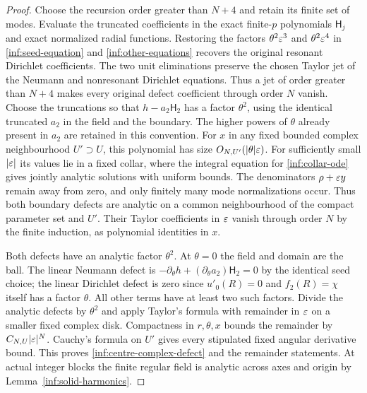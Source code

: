 \begin{proof}
Choose the recursion order greater than $N+4$ and retain its finite
set of modes. Evaluate the truncated coefficients in the exact
finite-$p$ polynomials $\mathsf H_j$ and exact normalized radial functions.
Restoring the factors $\theta^2\varepsilon^3$ and $\theta^2\varepsilon^4$
in \eqref{inf:seed-equation} and \eqref{inf:other-equations}
recovers the original resonant Dirichlet coefficients. The two
unit eliminations preserve the chosen Taylor jet of the Neumann
and nonresonant Dirichlet equations. Thus a jet of order greater
than $N+4$ makes every original defect coefficient through order
$N$ vanish.
Choose the truncations so that $h-a_2\mathsf H_2$ has a factor
$\theta^2$, using the identical truncated $a_2$ in the field and
the boundary. The higher powers of $\theta$ already present in
$a_2$ are retained in this convention.
For $x$ in any fixed bounded complex neighbourhood $U'\supset U$,
this polynomial has size $O_{N,U'}(|\theta|\varepsilon)$.
For sufficiently small $|\varepsilon|$ its values lie in a fixed collar,
where the integral equation for \eqref{inf:collar-ode} gives jointly
analytic solutions with uniform bounds. The denominators
$\rho+\varepsilon y$ remain away from zero, and only finitely many mode
normalizations occur. Thus both boundary defects are analytic on a
common neighbourhood of the compact parameter set and $U'$.
Their Taylor coefficients in $\varepsilon$ vanish through order $N$ by the
finite induction, as polynomial identities in $x$.

Both defects have an analytic factor $\theta^2$.
At $\theta=0$ the field and domain are the ball. The
linear Neumann defect is
$-\partial_\theta h+(\partial_\theta a_2)\mathsf H_2=0$ by the identical
seed choice; the linear Dirichlet defect is zero since
$u'_0(R)=0$ and $f_2(R)=\chi$ itself has a factor $\theta$.
All other terms have at least two such factors.
Divide the analytic defects by $\theta^2$ and apply Taylor's formula
with remainder in $\varepsilon$ on a smaller fixed complex disk. Compactness
in $r,\theta,x$ bounds the remainder by $C_{N,U}|\varepsilon|^N$.
Cauchy's formula on $U'$ gives every stipulated fixed angular
derivative bound. This proves \eqref{inf:centre-complex-defect} and
the remainder statements. At actual integer blocks the finite regular field is
analytic across axes and origin by Lemma~\ref{inf:solid-harmonics}.
\end{proof}

